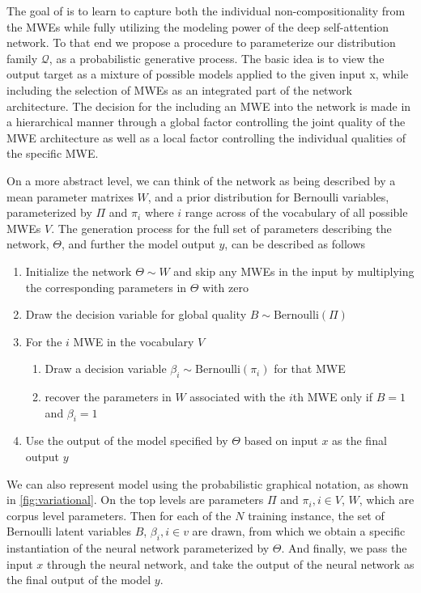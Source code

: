 The goal of \BertMWE is to learn to capture both the individual non-compositionality from the MWEs while fully utilizing the modeling power of the deep self-attention network. 
To that end we propose a procedure to parameterize our distribution family $\mathcal{Q}$, 
as a probabilistic generative process. 
The basic idea is to view the output target as a mixture of possible models applied to the given input x, 
while including the selection of MWEs as an integrated part of the network architecture.
The decision for the including an MWE into the network is made in a hierarchical manner through a global factor controlling the joint quality of the MWE architecture as well as a local factor controlling the individual qualities of the specific MWE.

On a more abstract level, we can think of the network as being described by a mean parameter matrixes $W$, and a prior distribution for Bernoulli variables, parameterized by $\Pi$ and $\pi_i$ where $i$ range across of the vocabulary of all possible MWEs $V$. The generation process for the full set of parameters describing the network, $\Theta$, and further the model output $y$, can be described as follows
\begin{enumerate}
    \item Initialize the network $\Theta \sim W$  and skip any MWEs in the input by multiplying the corresponding parameters in $\Theta$ with zero
    \item Draw the decision variable for global quality
        $B \sim \mbox{Bernoulli}(\Pi)$
    \item{For the $i$ MWE in the vocabulary $V$}
    \begin{enumerate}
        \item Draw a decision variable $\beta_i \sim \mbox{Bernoulli}(\pi_i)$ for that MWE 
        \item{recover the parameters in $W$ associated with the $i$th MWE only if $B=1$ and $\beta_{i}=1$}
    \end{enumerate}
    \item{Use the output of the model specified by $\Theta$ based on input $x$ as the final output $y$ }
\end{enumerate}


We can also represent \BertMWE model using the probabilistic graphical notation, as shown in \autoref{fig:variational}. 
On the top levels are parameters $\Pi$ and $\pi_i, i \in V$, $W$, which are corpus level parameters. Then for each of the $N$ training instance, the set of Bernoulli latent variables
$B$, $\beta_i, i\in v$ are drawn, from which we obtain a specific instantiation of the neural network parameterized by $\Theta$. And finally, we pass the input $x$ through the neural network, and take the output of the neural network as the final output of the model $y$.

